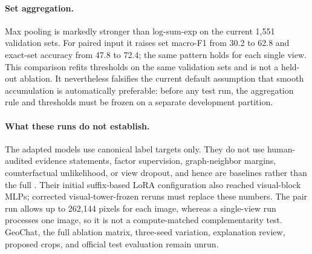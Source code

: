 

\paragraph{Set aggregation.}
Max pooling is markedly stronger than log-sum-exp on the current 1,551 validation sets. For paired input it raises set macro-F1 from 30.2 to 62.8 and exact-set accuracy from 47.8 to 72.4; the same pattern holds for each single view. This comparison refits thresholds on the same validation sets and is not a held-out ablation. It nevertheless falsifies the current default assumption that smooth accumulation is automatically preferable: before any test run, the aggregation rule and thresholds must be frozen on a separate development partition.

\paragraph{What these runs do not establish.}
The adapted models use canonical label targets only. They do not use human-audited evidence statements, factor supervision, graph-neighbor margins, counterfactual unlikelihood, or view dropout, and hence are baselines rather than the full \method. Their initial suffix-based LoRA configuration also reached visual-block MLPs; corrected visual-tower-frozen reruns must replace these numbers. The pair run allows up to 262,144 pixels for each image, whereas a single-view run processes one image, so it is not a compute-matched complementarity test. GeoChat, the full ablation matrix, three-seed variation, explanation review, proposed crops, and official test evaluation remain unrun.
